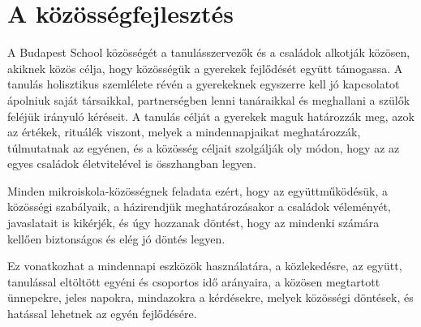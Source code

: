 \section{A közösségfejlesztés}
\label{sec:kozossegfejlesztes}
A Budapest School közösségét a tanulásszervezők és a családok alkotják
közösen, akiknek közös célja, hogy közösségük a gyerekek
fejlődését\linebreak
együtt támogassa. A tanulás holisztikus szemlélete révén a gyerekeknek egyszerre kell jó kapcsolatot ápolniuk saját társaikkal, partnerségben lenni tanáraikkal és meghallani a szülők feléjük irányuló kéréseit.  A tanulás célját a gyerekek maguk határozzák meg, azok az értékek, rituálék viszont, melyek a mindennapjaikat meghatározzák, túlmutatnak az egyénen, és a közösség céljait szolgálják oly módon, hogy az az egyes családok életvitelével is összhangban legyen.

Minden mikroiskola-közösségnek feladata ezért, hogy az együttműködésük, a közösségi szabályaik, a házirendjük meghatározásakor a családok véleményét, javaslatait is kikérjék, és úgy hozzanak döntést, hogy az mindenki számára kellően biztonságos és elég jó döntés legyen.

Ez vonatkozhat a mindennapi eszközök használatára, a közlekedésre, az együtt, tanulással eltöltött egyéni és csoportos idő arányaira, a közösen megtartott ünnepekre, jeles napokra,  mindazokra a kérdésekre, melyek közösségi döntések, és hatással lehetnek az egyén fejlődésére.

